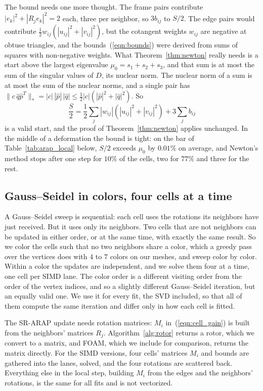 \documentclass{birkjour}
\theoremstyle{definition}
\theoremstyle{remark}
\numberwithin{equation}{section}
\begin{document}
The bound needs one more thought. The frame pairs contribute $|e_k|^2 + |R_j e_k|^2 = 2$ each, three per neighbor, so $3 b_{ij}$ to $S/2$. The edge pairs would contribute $\frac12 w_{ij} (|u_{ij}|^2 + |v_{ij}|^2)$, but the cotangent weights $w_{ij}$ are negative at obtuse triangles, and the bounds~(\ref{eqn:bounds}) were derived from sums of squares with non-negative weights. What Theorem~\ref{thm:newton} really needs is a start above the largest eigenvalue $\mu_0 = s_1 + s_2 + s_3$, and that sum is at most the sum of the singular values of $D$, its nuclear norm. The nuclear norm of a sum is at most the sum of the nuclear norms, and a single pair has $\|c\, \hat q \hat p^T\|_* = |c|\, |\hat p|\, |\hat q| \leq \frac12 |c| (|\hat p|^2 + |\hat q|^2)$. So
\begin{equation}
\label{eqn:cell_bound}
\frac{S}{2} = \frac12 \sum_j |w_{ij}| \left(|u_{ij}|^2 + |v_{ij}|^2\right) + 3 \sum_j b_{ij}
\end{equation}
is a valid start, and the proof of Theorem~\ref{thm:newton} applies unchanged. In the middle of a deformation the bound is tight: on the bar of Table~\ref{tab:arap_local} below, $S/2$ exceeds $\mu_0$ by $0.01\%$ on average, and Newton's method stops after one step for $10\%$ of the cells, two for $77\%$ and three for the rest.

\subsection{Gauss--Seidel in colors, four cells at a time}

A Gauss--Seidel sweep is sequential: each cell uses the rotations its neighbors have just received. But it uses only its neighbors. Two cells that are not neighbors can be updated in either order, or at the same time, with exactly the same result. So we color the cells such that no two neighbors share a color, which a greedy pass over the vertices does with $4$ to $7$ colors on our meshes, and sweep color by color. Within a color the updates are independent, and we solve them four at a time, one cell per SIMD lane. The color order is a different visiting order from the order of the vertex indices, and so a slightly different Gauss--Seidel iteration, but an equally valid one. We use it for every fit, the SVD included, so that all of them compute the same iteration and differ only in how each cell is fitted.

The SR-ARAP update needs rotation matrices: $M_i$ in~(\ref{eqn:cell_gain}) is built from the neighbors' matrices $R_j$. Algorithm~\ref{alg:rotor} returns a rotor, which we convert to a matrix, and FOAM, which we include for comparison, returns the matrix directly. For the SIMD versions, four cells' matrices $M_i$ and bounds are gathered into the lanes, solved, and the four rotations are scattered back. Everything else in the local step, building $M_i$ from the edges and the neighbors' rotations, is the same for all fits and is not vectorized.
\end{document}
